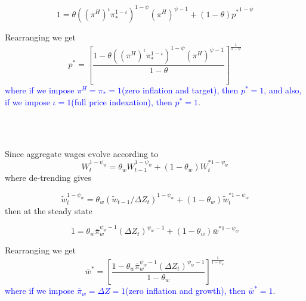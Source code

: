 \documentclass[11pt,titlepage]{article}
\begin{document}
\begin{itemize}
\begin{equation*}
1 = {\theta} {({(\pi^H)}^\iota \pi_{*}^{1-\iota})}^{1-\psi} {(\pi^H)}^{\psi-1}  + (1-\theta)  {p^{*}}^{1-\psi}
\end{equation*}

Rearranging we get
\begin{equation}
p^{*} = \left[\frac{1-{\theta} {({(\pi^H)}^\iota \pi_{*}^{1-\iota})}^{1-\psi} {(\pi^H)}^{\psi-1}}{1-\theta}\right]^{\frac{1}{1-\psi}}
\end{equation}
\textcolor{blue}{where if we impose $\pi^H=\pi_{*}=1$(zero inflation and target), then $p^{*}=1$, and also, if we impose $\iota=1$(full price indexation), then $p^{*}=1$}.

~\\~

Since aggregate wages evolve according to
\begin{equation*}
W_{t}^{1-\psi_{w}} = \theta_{w} W_{t-1}^{1-\psi_{w}} + \left(1-\theta_{w}\right)W_{t}^{*1-\psi_{w}}
\end{equation*}
where de-trending gives

\begin{equation*}
\tilde{w}_{t}^{1-\psi_{w}} = \theta_{w} \left(\tilde{w}_{t-1}/\Delta Z_{t}\right)^{1-\psi_{w}} + \left(1-\theta_{w}\right) \tilde{w}_{t}^{*1-\psi_{w}}
\end{equation*}
then at the steady state

\begin{equation*}
1 = \theta_{w} \bar{\pi}_{w}^{\psi_{w}-1} \left(\Delta Z_{t}\right)^{\psi_{w}-1} + \left(1-\theta_{w}\right) \bar{w}^{*1-\psi_{w}}
\end{equation*}

Rearranging we get
\begin{equation}
\bar{w}^{*} = \left[\frac{1-\theta_{w} \bar{\pi}_{w}^{\psi_{w}-1} \left(\Delta Z_{t}\right)^{\psi_{w}-1}}{1-\theta_{w}}\right]^{\frac{1}{1-\psi_{w}}}
\end{equation}
\textcolor{blue}{where if we impose $\bar{\pi}_{w}=\Delta Z=1$(zero inflation and growth), then $\bar{w}^{*}=1$}.

\end{itemize}
\end{document}
